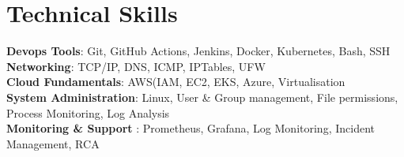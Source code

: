 \documentclass[letterpaper,11pt]{article}
\begin{document}
	
	\section{Technical Skills}
	\begin{itemize}[leftmargin=0.15in, label={}]
		\small{\item{
				\textbf{Devops Tools}{: Git, GitHub Actions, Jenkins, Docker, Kubernetes, Bash, SSH} \\
				\textbf{Networking}{: TCP/IP, DNS, ICMP, IPTables, UFW} \\
				\textbf{Cloud Fundamentals}{: AWS(IAM, EC2, EKS}, Azure, Virtualisation} \\
			\textbf{System Administration}{: Linux, User \& Group management, File permissions, Process Monitoring, Log Analysis} \\
			\textbf{Monitoring \& Support }{: Prometheus, Grafana, Log Monitoring, Incident Management, RCA}
		}
	\end{itemize}
	
	
\end{document}
